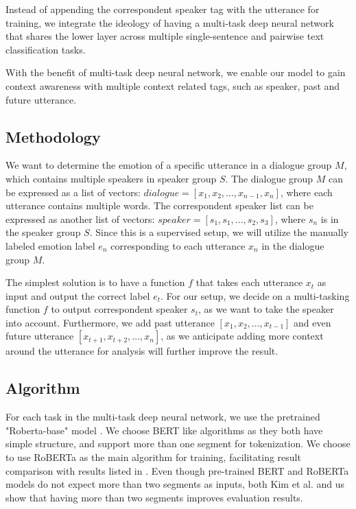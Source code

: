 \documentclass[11pt]{article}
\begin{document}
Instead of appending the correspondent speaker tag with the utterance for training, we integrate the ideology of having a multi-task deep neural network that shares the lower layer across multiple single-sentence and pairwise text classification tasks. 

With the benefit of multi-task deep neural network, we enable our model to gain context awareness with multiple context related tags, such as speaker, past and future utterance.

\subsection{Methodology}

We want to determine the emotion of a specific utterance in a dialogue group $M$, which contains multiple speakers in speaker group $S$. The dialogue group $M$ can be expressed as a list of vectors: $dialogue = [x_1, x_2, ..., x_{n-1}, x_n]$, where each utterance contains multiple words. The correspondent speaker list can be expressed as another list of vectors: $speaker = [s_1, s_1, ..., s_2, s_3]$, where $s_n$ is in the speaker group $S$. Since this is a supervised setup, we will utilize the manually labeled emotion label $e_n$ corresponding to each utterance $x_n$ in the dialogue group $M$.

The simplest solution is to have a function $f$ that takes each utterance $x_t$ as input and output the correct label $e_t$. For our setup, we decide on a multi-tasking function $f$ to output correspondent speaker $s_t$, as we want to take the speaker into account. Furthermore, we add past utterance $[x_1, x_2, ..., x_{t-1}]$ and even future utterance $[x_{t+1}, x_{t+2}, ..., x_n]$, as we anticipate adding more context around the utterance for analysis will further improve the result.


\subsection{Algorithm}

For each task in the multi-task deep neural network, we use the pretrained "Roberta-base" model \citet{liu-etal-2019-multi}. We choose BERT like algorithms as they both have simple structure, and support more than one segment for tokenization. We choose to use RoBERTa as the main algorithm for training, facilitating result comparison with results listed in \citet{kim-2021-emoberta}. Even though pre-trained BERT and RoBERTa models do not expect more than two segments as inputs, both Kim et al. and us show that having more than two segments improves evaluation results.
\end{document}
